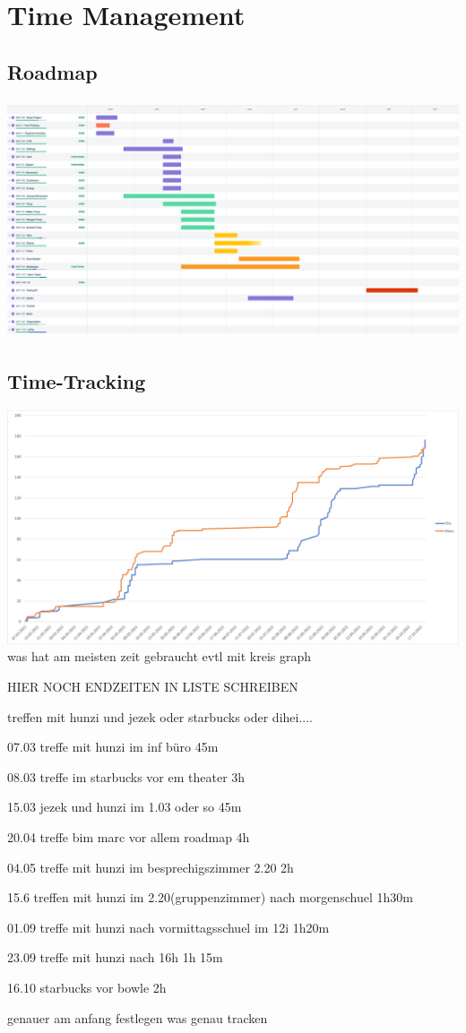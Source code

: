 \chapter{Time Management}

\section{Roadmap}
\includegraphics[height=7cm]{resources/Roadmap.png}\\

\section{Time-Tracking}
\includegraphics*[width=15cm]{resources/graph.png}\\

was hat am meisten zeit gebraucht evtl mit kreis graph

HIER NOCH ENDZEITEN IN LISTE SCHREIBEN



treffen mit hunzi und jezek oder starbucks oder dihei....

07.03 treffe mit hunzi im inf büro 45m

08.03 treffe im starbucks vor em theater 3h

15.03 jezek und hunzi im 1.03 oder so 45m

20.04 treffe bim marc vor allem roadmap 4h

04.05 treffe mit hunzi im besprechigszimmer 2.20 2h

15.6 treffen mit hunzi im 2.20(gruppenzimmer) nach morgenschuel 1h30m

01.09 treffe mit hunzi nach vormittagsschuel im 12i 1h20m

23.09 treffe mit hunzi nach 16h 1h 15m

16.10 starbucks vor bowle 2h



genauer am anfang festlegen was genau tracken
